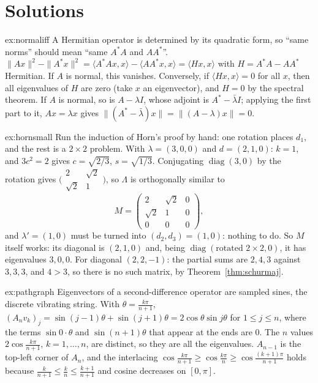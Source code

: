 \section{Solutions}

\begin{solution}{ex:normaliff}
\idea A Hermitian operator is determined by its quadratic form, so ``same norms'' should mean ``same $A^*A$ and $AA^*$''.
\writeup $\|Ax\|^2-\|A^*x\|^2=\langle A^*Ax,x\rangle-\langle AA^*x,x\rangle=\langle Hx,x\rangle$ with $H=A^*A-AA^*$ Hermitian.
If $A$ is normal, this vanishes. Conversely, if $\langle Hx,x\rangle=0$ for all $x$, then all eigenvalues of $H$ are zero
(take $x$ an eigenvector), and $H=0$ by the spectral theorem. If $A$ is normal, so is $A-\lambda I$, whose adjoint is
$A^*-\bar\lambda I$; applying the first part to it, $Ax=\lambda x$ gives $\|(A^*-\bar\lambda)x\|=\|(A-\lambda)x\|=0$.
\end{solution}

\begin{solution}{ex:hornsmall}
\idea Run the induction of Horn's proof by hand: one rotation places $d_1$, and the rest is a $2\times2$ problem.
\writeup With $\lambda=(3,0,0)$ and $d=(2,1,0)$: $k=1$, and $3c^2=2$ gives $c=\sqrt{2/3}$, $s=\sqrt{1/3}$. Conjugating
$\operatorname{diag}(3,0)$ by the rotation gives $\bigl(\begin{smallmatrix}2&\sqrt2\\\sqrt2&1\end{smallmatrix}\bigr)$, so
$\Lambda$ is orthogonally similar to
\[
M=\begin{pmatrix}2&\sqrt2&0\\\sqrt2&1&0\\0&0&0\end{pmatrix},
\]
and $\lambda'=(1,0)$ must be turned into $(d_2,d_3)=(1,0)$: nothing to do. So $M$ itself works: its diagonal is $(2,1,0)$
and, being $\operatorname{diag}(\text{rotated }2\times2,0)$, it has eigenvalues $3,0,0$. For diagonal $(2,2,-1)$: the
partial sums are $2,4,3$ against $3,3,3$, and $4>3$, so there is no such matrix, by Theorem~\ref{thm:schurmaj}.
\end{solution}

\begin{solution}{ex:pathgraph}
\idea Eigenvectors of a second-difference operator are sampled sines, the discrete vibrating string.
\writeup With $\theta=\frac{k\pi}{n+1}$, $(A_nv_k)_j=\sin(j-1)\theta+\sin(j+1)\theta=2\cos\theta\sin j\theta$ for $1\le j\le n$,
where the terms $\sin0\cdot\theta$ and $\sin(n+1)\theta$ that appear at the ends are $0$. The $n$ values $2\cos\frac{k\pi}
{n+1}$, $k=1,\dots,n$, are distinct, so they are all the eigenvalues. $A_{n-1}$ is the top-left corner of $A_n$, and the
interlacing $\cos\frac{k\pi}{n+1}\ge\cos\frac{k\pi}n\ge\cos\frac{(k+1)\pi}{n+1}$ holds because $\frac k{n+1}\le\frac kn\le
\frac{k+1}{n+1}$ and cosine decreases on $[0,\pi]$.
\end{solution}

